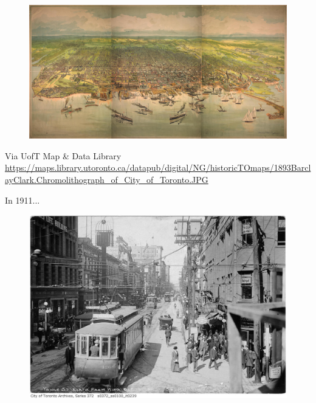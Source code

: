 \documentclass[aspectratio=169]{beamer}
\begin{document}
\begin{frame}
	
	\begin{figure}
		\centering
		\includegraphics[width=1.1\linewidth]{images/toronto_1893.jpg}
		
	\end{figure}
	\tiny{Via UofT Map \& Data Library \url{https://maps.library.utoronto.ca/datapub/digital/NG/historicTOmaps/1893BarclayClark.Chromolithograph_of_City_of_Toronto.JPG}}
	
\end{frame}










\begin{frame}
	
	In 1911...
	
	\begin{figure}
		\centering
		\includegraphics[width=0.8\linewidth]{images/yonge-north-from-king-1911.jpg}
		
	\end{figure}

	
\end{frame}
\end{document}
